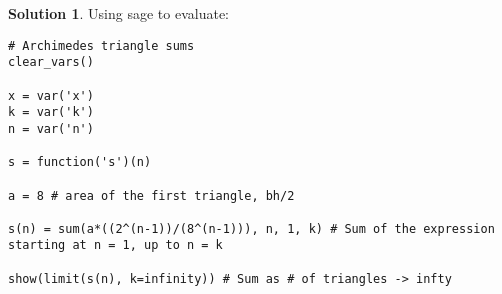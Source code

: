 \documentclass[10pt]{article}
\theoremstyle{definition}
\newtheorem{soln}{Solution}
\begin{document}
\begin{soln}
    \noindent Using sage to evaluate:
    \begin{verbatim}
# Archimedes triangle sums
clear_vars()
        
x = var('x')
k = var('k')
n = var('n')
        
s = function('s')(n)
        
a = 8 # area of the first triangle, bh/2
        
s(n) = sum(a*((2^(n-1))/(8^(n-1))), n, 1, k) # Sum of the expression starting at n = 1, up to n = k
        
show(limit(s(n), k=infinity)) # Sum as # of triangles -> infty
    \end{verbatim}
\end{soln}
\end{document}
